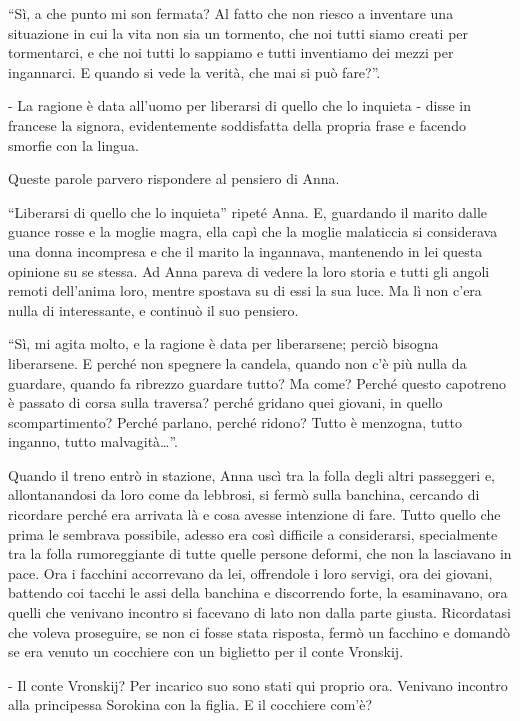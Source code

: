 ``Sì, a che punto mi son fermata? Al fatto che non riesco a inventare una situazione in cui la vita non sia un tormento, che noi tutti siamo creati per tormentarci, e che noi tutti lo sappiamo e tutti inventiamo dei mezzi per ingannarci. E quando si vede la verità, che mai si può fare?''. 

- La ragione è data all'uomo per liberarsi di quello che lo inquieta - disse in francese la signora, evidentemente soddisfatta della propria frase e facendo smorfie con la lingua. 

Queste parole parvero rispondere al pensiero di Anna. 

``Liberarsi di quello che lo inquieta'' ripeté Anna. E, guardando il marito dalle guance rosse e la moglie magra, ella capì che la moglie malaticcia si considerava una donna incompresa e che il marito la ingannava, mantenendo in lei questa opinione su se stessa. Ad Anna pareva di vedere la loro storia e tutti gli angoli remoti dell'anima loro, mentre spostava su di essi la sua luce. Ma lì non c'era nulla di interessante, e continuò il suo pensiero. 

``Sì, mi agita molto, e la ragione è data per liberarsene; perciò bisogna liberarsene. E perché non spegnere la candela, quando non c'è più nulla da guardare, quando fa ribrezzo guardare tutto? Ma come? Perché questo capotreno è passato di corsa sulla traversa? perché gridano quei giovani, in quello scompartimento? Perché parlano, perché ridono? Tutto è menzogna, tutto inganno, tutto malvagità\ldots{}''. 

Quando il treno entrò in stazione, Anna uscì tra la folla degli altri passeggeri e, allontanandosi da loro come da lebbrosi, si fermò sulla banchina, cercando di ricordare perché era arrivata là e cosa avesse intenzione di fare. Tutto quello che prima le sembrava possibile, adesso era così difficile a considerarsi, specialmente tra la folla rumoreggiante di tutte quelle persone deformi, che non la lasciavano in pace. Ora i facchini accorrevano da lei, offrendole i loro servigi, ora dei giovani, battendo coi tacchi le assi della banchina e discorrendo forte, la esaminavano, ora quelli che venivano incontro si facevano di lato non dalla parte giusta. Ricordatasi che voleva proseguire, se non ci fosse stata risposta, fermò un facchino e domandò se era venuto un cocchiere con un biglietto per il conte Vronskij. 

- Il conte Vronskij? Per incarico suo sono stati qui proprio ora. Venivano incontro alla principessa Sorokina con la figlia. E il cocchiere com'è? 

